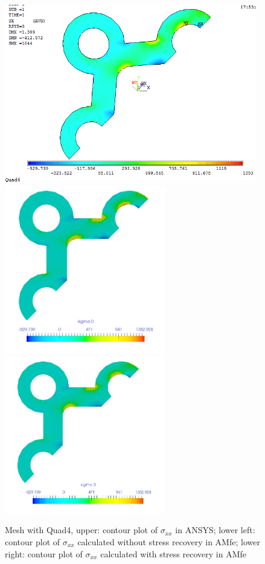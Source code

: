 \begin{figure}[htbp]
	\begin{center}
		\includegraphics[width=11cm,clip]{Quad4_Sxx.png} 
		\includegraphics[width=7cm,clip]{Quad4_Sxx_PD.png} 			
		\includegraphics[width=7cm,clip]{Quad4_Sxx_P.png} 		
		\caption{Mesh with Quad4, upper: contour plot of $\sigma_{xx}$ in ANSYS; lower left: contour plot of $\sigma_{xx}$ calculated without stress recovery in AMfe; lower right: contour plot of $\sigma_{xx}$ calculated with stress recovery in AMfe} \label{fig: Quad4_Sxx}
	\end{center}
\end{figure}
\clearpage 

